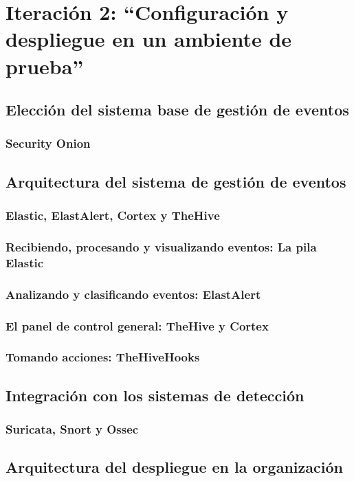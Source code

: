 \chapter{Iteración 2: “Configuración y despliegue en un ambiente de prueba”}
    \section{Elección del sistema base de gestión de eventos}
        \subsection{Security Onion}
    \section{Arquitectura del sistema de gestión de eventos}
        \subsection{Elastic, ElastAlert, Cortex y TheHive}
        \subsection{Recibiendo, procesando y visualizando eventos: La pila Elastic}
        \subsection{Analizando y clasificando eventos: ElastAlert}
        \subsection{El panel de control general: TheHive y Cortex}
        \subsection{Tomando acciones: TheHiveHooks}
    \section{Integración con los sistemas de detección}
        \subsection{Suricata, Snort y Ossec}
    \section{Arquitectura del despliegue en la organización}